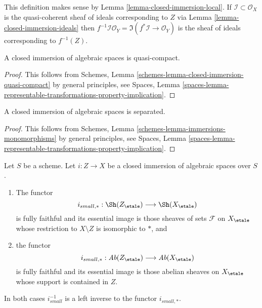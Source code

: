 \noindent
This definition makes sense by Lemma \ref{lemma-closed-immersion-local}.
If $\mathcal{I} \subset \mathcal{O}_X$ is the quasi-coherent sheaf of
ideals corresponding to $Z$ via Lemma \ref{lemma-closed-immersion-ideals} then
$f^{-1}\mathcal{I}\mathcal{O}_Y = \Im(f^*\mathcal{I} \to \mathcal{O}_Y)$
is the sheaf of ideals corresponding to $f^{-1}(Z)$.

\begin{lemma}
\label{lemma-closed-immersion-quasi-compact}
A closed immersion of algebraic spaces is quasi-compact.
\end{lemma}

\begin{proof}
This follows from
Schemes, Lemma \ref{schemes-lemma-closed-immersion-quasi-compact}
by general principles, see
Spaces, Lemma
\ref{spaces-lemma-representable-transformations-property-implication}.
\end{proof}

\begin{lemma}
\label{lemma-closed-immersion-separated}
A closed immersion of algebraic spaces is separated.
\end{lemma}

\begin{proof}
This follows from
Schemes, Lemma \ref{schemes-lemma-immersions-monomorphisms}
by general principles, see
Spaces, Lemma
\ref{spaces-lemma-representable-transformations-property-implication}.
\end{proof}

\begin{lemma}
\label{lemma-closed-immersion-push-pull}
Let $S$ be a scheme. Let $i : Z \to X$ be a closed immersion of algebraic
spaces over $S$.
\begin{enumerate}
\item The functor
$$
i_{small, *} :
\Sh(Z_\etale)
\longrightarrow
\Sh(X_\etale)
$$
is fully faithful and its essential image is those sheaves of sets
$\mathcal{F}$ on $X_\etale$ whose restriction to $X \setminus Z$ is
isomorphic to $*$, and
\item the functor
$$
i_{small, *} :
\textit{Ab}(Z_\etale)
\longrightarrow
\textit{Ab}(X_\etale)
$$
is fully faithful and its essential image is those abelian sheaves on
$X_\etale$ whose support is contained in $Z$.
\end{enumerate}
In both cases $i_{small}^{-1}$ is a left inverse to the functor
$i_{small, *}$.
\end{lemma}

